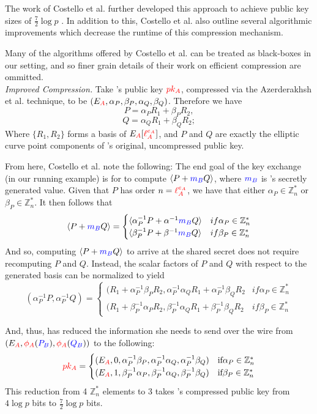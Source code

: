 The work of Costello et al. further developed this approach to achieve public key sizes of $\frac{7}{2}\log p$ \cite{pkcomp}. In addition to this, Costello et al. also outline several algorithmic improvements which decrease the runtime of this compression mechanism.

Many of the algorithms offered by Costello et al. can be treated as black-boxes in our setting, and so finer grain details of their work on efficient compression are ommitted.\\

\noindent
\textit{Improved Compression.} Take \alice's public key $\textcolor{red}{pk_A}$, compressed via the Azerderakhsh et al. technique, to be $(E_{\textcolor{red}{A}}, \alpha_{P}, \beta_{P}, \alpha_{Q}, \beta_{Q})$. Therefore we have
$$
P = \alpha_{P}R_1 + \beta_{P}R_2,
$$
$$
Q = \alpha_{Q}R_1 + \beta_{Q}R_2;
$$
Where $\{R_1, R_2\}$ forms a basis of $E_{\textcolor{red}{A}}[\textcolor{red}{\ell_{A}^{e_A}}]$, and $P$ and $Q$ are exactly the elliptic curve point components of \alice's original, uncompressed public key.

From here, Costello et al. note the following: The end goal of the key exchange (in our running example) is for \bob to compute $\langle P + \textcolor{blue}{m_B} Q\rangle$, where $\textcolor{blue}{m_B}$ is \bob's secretly generated value. Given that $P$ has order $n = \textcolor{red}{\ell_{A}^{e_A}}$, we have that either $\alpha_{P} \in \mathbb{Z}^{*}_{n}$ or $\beta_{P} \in \mathbb{Z}^{*}_{n}$. It then follows that
$$
\langle P + \textcolor{blue}{m_B} Q \rangle =  \begin{cases}
							\langle \alpha^{-1}_{P}P + \alpha^{-1}\textcolor{blue}{m_B} Q \rangle & if \alpha_{P} \in \mathbb{Z}^{*}_{n}\\
							\langle \beta^{-1}_{P}P + \beta^{-1}\textcolor{blue}{m_B} Q \rangle & if \beta_{P} \in \mathbb{Z}^{*}_{n}
							\end{cases}
$$
And so, computing $\langle P + \textcolor{blue}{m_B} Q\rangle$ to arrive at the shared secret does not require recomputing $P$ and $Q$. Instead, the scalar factors of $P$ and $Q$ with respect to the generated basis can be normalized to yield
$$
(\alpha^{-1}_{P}P, \alpha^{-1}_{P}Q) = \begin{cases}
							(R_{1} + \alpha^{-1}_{P}\beta_{P} R_{2}, \alpha^{-1}_{P}\alpha_{Q}R_{1} + \alpha^{-1}_{P}\beta_{Q}R_{2}  & if \alpha_{P} \in \mathbb{Z}^{*}_{n}\\
							(R_{1} + \beta^{-1}_{P}\alpha_{P} R_{2}, \beta^{-1}_{P}\alpha_{Q}R_{1} + \beta^{-1}_{P}\beta_{Q}R_{2} & if \beta_{P} \in \mathbb{Z}^{*}_{n}
						   	\end{cases}
$$

And, thus, \alice has reduced the information she needs to send over the wire from $(E_{\textcolor{red}{A}}, \textcolor{red}{\phi_A}(\textcolor{blue}{P_B}), \textcolor{red}{\phi_A}(\textcolor{blue}{Q_B}))$ to the following:
$$
\textcolor{red}{pk_A} = \begin{cases}
	   (E_{\textcolor{red}{A}}, 0, \alpha^{-1}_{P}\beta_{P}, \alpha^{-1}_{P}\alpha_{Q}, \alpha^{-1}_{P}\beta_{Q}) & \text{if} \alpha_{P} \in \mathbb{Z}^{*}_{n}\\
	   (E_{\textcolor{red}{A}}, 1, \beta^{-1}_{P}\alpha_{P}, \beta^{-1}_{P}\alpha_{Q}, \beta^{-1}_{P}\beta_{Q}) & \text{if} \beta_{P} \in \mathbb{Z}^{*}_{n}
	   \end{cases}
$$
This reduction from 4 $\mathbb{Z}^{*}_{n}$ elements to 3 takes \alice's compressed public key from $4\log p$ bits to $\frac{7}{2}\log p$ bits.\\

